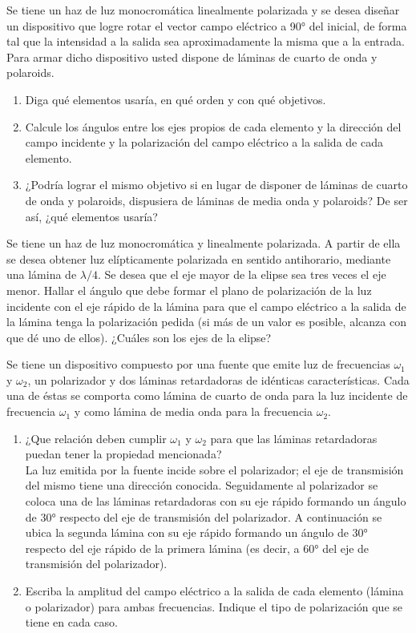 \item Se tiene un haz de luz monocromática linealmente polarizada y se desea diseñar un dispositivo que logre rotar el vector campo eléctrico a \ang{90;;} del inicial, de forma tal que la intensidad a la salida sea aproximadamente la misma que a la entrada.
Para armar dicho dispositivo usted dispone de láminas de cuarto de onda y polaroids.
\begin{enumerate}
	\item Diga qué elementos usaría, en qué orden y con qué objetivos.
	\item Calcule los ángulos entre los ejes propios de cada elemento y la dirección del campo incidente y la polarización del campo eléctrico a la salida de cada elemento.
	\item ¿Podría lograr el mismo objetivo si en lugar de disponer de láminas de cuarto de onda y polaroids, dispusiera de láminas de media onda y polaroids?
	De ser así, ¿qué elementos usaría?
\end{enumerate}



\item Se tiene un haz de luz monocromática y linealmente polarizada.
A partir de ella se desea obtener luz elípticamente polarizada en sentido antihorario, mediante una lámina de \(\lambda/4\).
Se desea que el eje mayor de la elipse sea tres veces el eje menor.
Hallar el ángulo que debe formar el plano de polarización de la luz incidente con el eje rápido de la lámina para que el campo eléctrico a la salida de la lámina
tenga la polarización pedida (si más de un valor es posible, alcanza con que dé uno de ellos).
¿Cuáles son los ejes de la elipse?



\item Se tiene un dispositivo compuesto por una fuente que emite luz de frecuencias $\omega_1$ y $\omega_2$, un polarizador y dos láminas retardadoras de idénticas características.
Cada una de éstas se comporta como lámina de cuarto de onda para la luz incidente de frecuencia $\omega_1$ y como lámina de media onda para la frecuencia $\omega_2$.
\begin{enumerate}
	\item ¿Que relación deben cumplir $\omega_1$ y $\omega_2$ para que las láminas retardadoras puedan tener la propiedad mencionada? \medskip{} \\
	La luz emitida por la fuente incide sobre el polarizador; el eje de transmisión del mismo tiene una dirección conocida.
	Seguidamente al polarizador se coloca una de las láminas retardadoras con su eje rápido formando un ángulo de \ang{+30;;} respecto del eje de transmisión del polarizador.
	A continuación se ubica la segunda lámina con su eje rápido formando un ángulo de \ang{+30;;} respecto del eje rápido de la primera lámina (es decir, a \ang{+60;;} del eje de transmisión del polarizador).
	\item Escriba la amplitud del campo eléctrico a la salida de cada elemento (lámina o polarizador) para ambas frecuencias.
	Indique el tipo de polarización que se tiene en cada caso. 
\end{enumerate}




